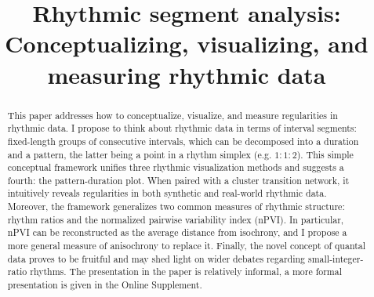 \documentclass{tMAM2e}%
\theoremstyle{plain}
\theoremstyle{definition}
\theoremstyle{remark}
\begin{document}


\title{Rhythmic segment analysis:\\
Conceptualizing, visualizing, and measuring rhythmic data}

\author{
%
%
\received{}
}

\maketitle

\begin{abstract}
This paper addresses how to conceptualize, visualize, and measure regularities in rhythmic data.
I propose to think about rhythmic data in terms of interval segments: fixed-length groups of consecutive intervals, which can be decomposed into a duration and a pattern, the latter being a point in a rhythm simplex (e.g. $1 : 1 : 2$). 
This simple conceptual framework unifies three rhythmic visualization methods and suggests a fourth: the pattern-duration plot. 
When paired with a cluster transition network, it intuitively reveals regularities in both synthetic and real-world rhythmic data. 
Moreover, the framework generalizes two common measures of rhythmic structure: rhythm ratios and the normalized pairwise variability index (nPVI). 
In particular, nPVI can be reconstructed as the average distance from isochrony, and I propose a more general measure of anisochrony to replace it. 
Finally, the novel concept of quantal data proves to be fruitful and 
may shed light on wider debates regarding small-integer-ratio rhythms. 
The presentation in the paper is relatively informal, a more formal presentation is given in the Online Supplement.
\end{abstract}
\end{document}
